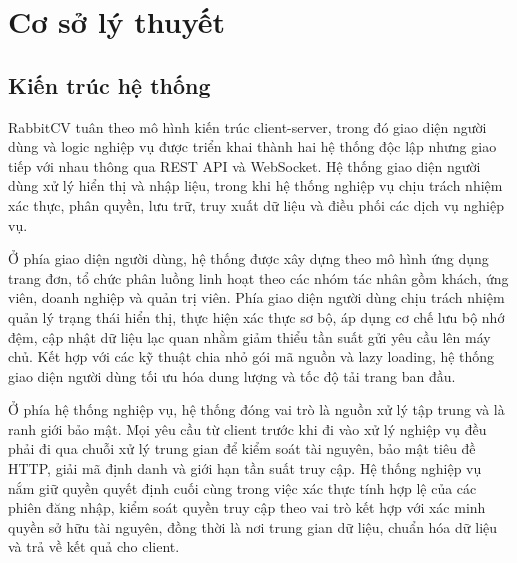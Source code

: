 \chapter{Cơ sở lý thuyết}

\section{Kiến trúc hệ thống}

RabbitCV tuân theo mô hình kiến trúc client-server, trong đó giao diện người dùng và logic nghiệp vụ được triển khai thành hai hệ thống độc lập nhưng giao tiếp với nhau thông qua REST API và WebSocket. Hệ thống giao diện người dùng xử lý hiển thị và nhập liệu, trong khi hệ thống nghiệp vụ chịu trách nhiệm xác thực, phân quyền, lưu trữ, truy xuất dữ liệu và điều phối các dịch vụ nghiệp vụ.

Ở phía giao diện người dùng, hệ thống được xây dựng theo mô hình ứng dụng trang đơn, tổ chức phân luồng linh hoạt theo các nhóm tác nhân gồm khách, ứng viên, doanh nghiệp và quản trị viên. Phía giao diện người dùng chịu trách nhiệm quản lý trạng thái hiển thị, thực hiện xác thực sơ bộ, áp dụng cơ chế lưu bộ nhớ đệm, cập nhật dữ liệu lạc quan nhằm giảm thiểu tần suất gửi yêu cầu lên máy chủ. Kết hợp với các kỹ thuật chia nhỏ gói mã nguồn và lazy loading, hệ thống giao diện người dùng tối ưu hóa dung lượng và tốc độ tải trang ban đầu.

Ở phía hệ thống nghiệp vụ, hệ thống đóng vai trò là nguồn xử lý tập trung và là ranh giới bảo mật. Mọi yêu cầu từ client trước khi đi vào xử lý nghiệp vụ đều phải đi qua chuỗi xử lý trung gian để kiểm soát tài nguyên, bảo mật tiêu đề HTTP, giải mã định danh và giới hạn tần suất truy cập. Hệ thống nghiệp vụ nắm giữ quyền quyết định cuối cùng trong việc xác thực tính hợp lệ của các phiên đăng nhập, kiểm soát quyền truy cập theo vai trò kết hợp với xác minh quyền sở hữu tài nguyên, đồng thời là nơi trung gian dữ liệu, chuẩn hóa dữ liệu và trả về kết quả cho client.



